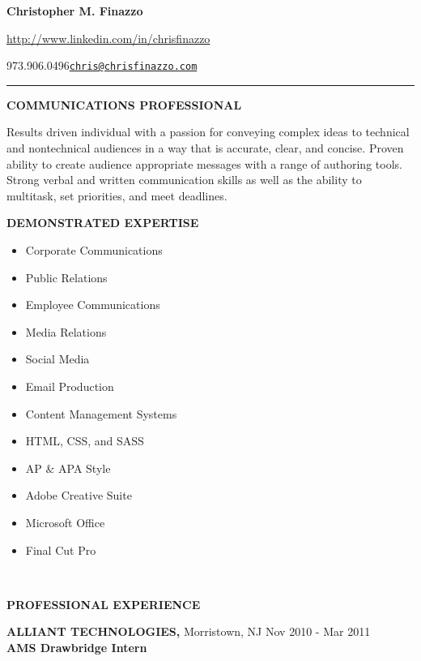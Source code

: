 \documentclass[]{article}
\title{}
\date{}
\providecommand{\tightlist}{%
  \setlength{\itemsep}{0pt}\setlength{\parskip}{0pt}}
\begin{document}
\textbf{Christopher M. Finazzo}

\url{http://www.linkedin.com/in/chrisfinazzo}

{973.906.0496}{\href{mailto:chris@chrisfinazzo.com}{\nolinkurl{chris@chrisfinazzo.com}}}\\

\begin{center}\rule{0.5\linewidth}{\linethickness}\end{center}

\textbf{COMMUNICATIONS PROFESSIONAL}

Results driven individual with a passion for conveying complex ideas to
technical and nontechnical audiences in a way that is accurate, clear,
and concise. Proven ability to create audience appropriate messages with
a range of authoring tools. Strong verbal and written communication
skills as well as the ability to multitask, set priorities, and meet
deadlines.

\textbf{DEMONSTRATED EXPERTISE}

\begin{itemize}
\tightlist
\item
  Corporate Communications
\item
  Public Relations
\item
  Employee Communications
\item
  Media Relations
\end{itemize}

\begin{itemize}
\tightlist
\item
  Social Media
\item
  Email Production
\item
  Content Management Systems
\item
  HTML, CSS, and SASS
\end{itemize}

\begin{itemize}
\tightlist
\item
  AP \& APA Style
\item
  Adobe Creative Suite
\item
  Microsoft Office
\item
  Final Cut Pro
\end{itemize}

~

\textbf{PROFESSIONAL EXPERIENCE}

{\textbf{ALLIANT TECHNOLOGIES,} Morristown, NJ}{ Nov 2010 - Mar 2011}\\
\textbf{AMS Drawbridge Intern}
\end{document}
